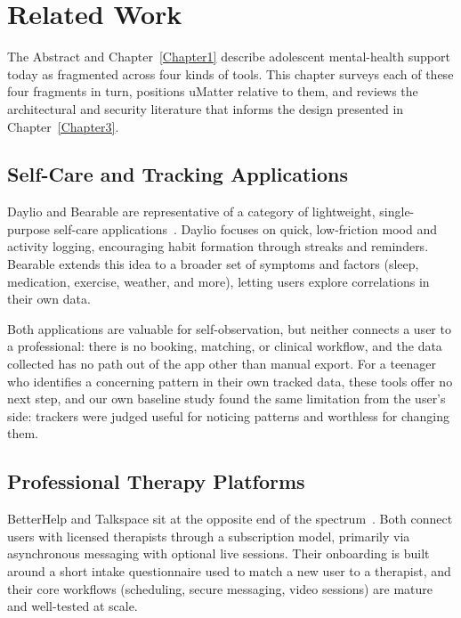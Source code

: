 \chapter{Related Work}
\label{Chapter2}

The Abstract and Chapter~\ref{Chapter1} describe adolescent mental-health support today as fragmented across four kinds of tools. This chapter surveys each of these four fragments in turn, positions uMatter relative to them, and reviews the architectural and security literature that informs the design presented in Chapter~\ref{Chapter3}.

\section{Self-Care and Tracking Applications}

Daylio and Bearable are representative of a category of lightweight, single-purpose self-care applications~\cite{Daylio,Bearable}. Daylio focuses on quick, low-friction mood and activity logging, encouraging habit formation through streaks and reminders. Bearable extends this idea to a broader set of symptoms and factors (sleep, medication, exercise, weather, and more), letting users explore correlations in their own data.

Both applications are valuable for self-observation, but neither connects a user to a professional: there is no booking, matching, or clinical workflow, and the data collected has no path out of the app other than manual export. For a teenager who identifies a concerning pattern in their own tracked data, these tools offer no next step, and our own baseline study found the same limitation from the user's side: trackers were judged useful for noticing patterns and worthless for changing them.

\section{Professional Therapy Platforms}

BetterHelp and Talkspace sit at the opposite end of the spectrum~\cite{BetterHelp,Talkspace}. Both connect users with licensed therapists through a subscription model, primarily via asynchronous messaging with optional live sessions. Their onboarding is built around a short intake questionnaire used to match a new user to a therapist, and their core workflows (scheduling, secure messaging, video sessions) are mature and well-tested at scale.

